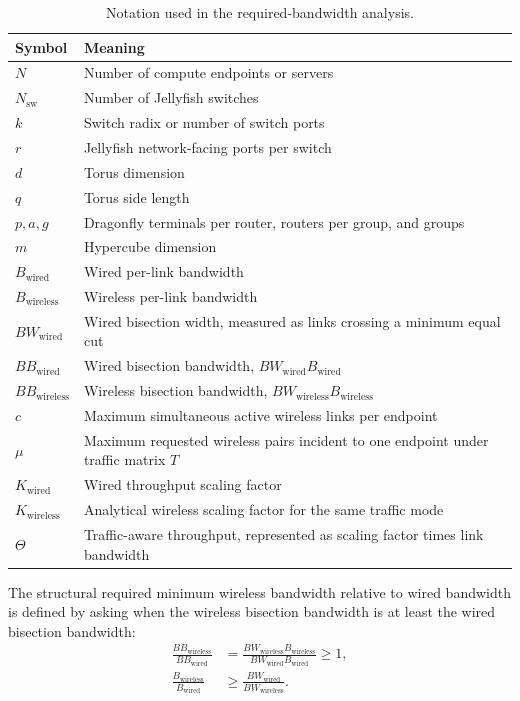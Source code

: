 \documentclass[conference]{IEEEtran}
\begin{document}
\begin{table}[!t]
\centering
\caption{Notation used in the required-bandwidth analysis.}
\scriptsize
\begin{tabular}{p{}p{}}
\toprule
Symbol & Meaning \\
\midrule
\(N\) & Number of compute endpoints or servers \\
\(N_{\mathrm{sw}}\) & Number of Jellyfish switches \\
\(k\) & Switch radix or number of switch ports \\
\(r\) & Jellyfish network-facing ports per switch \\
\(d\) & Torus dimension \\
\(q\) & Torus side length \\
\(p,a,g\) & Dragonfly terminals per router, routers per group, and groups \\
\(m\) & Hypercube dimension \\
\(B_{\mathrm{wired}}\) & Wired per-link bandwidth \\
\(B_{\mathrm{wireless}}\) & Wireless per-link bandwidth \\
\(BW_{\mathrm{wired}}\) & Wired bisection width, measured as links crossing a minimum equal cut \\
\(BB_{\mathrm{wired}}\) & Wired bisection bandwidth, \(BW_{\mathrm{wired}}B_{\mathrm{wired}}\) \\
\(BB_{\mathrm{wireless}}\) & Wireless bisection bandwidth, \(BW_{\mathrm{wireless}}B_{\mathrm{wireless}}\) \\
\(c\) & Maximum simultaneous active wireless links per endpoint \\
\(\mu\) & Maximum requested wireless pairs incident to one endpoint under traffic matrix \(T\) \\
\(K_{\mathrm{wired}}\) & Wired throughput scaling factor \\
\(K_{\mathrm{wireless}}\) & Analytical wireless scaling factor for the same traffic mode \\
\(\Theta\) & Traffic-aware throughput, represented as scaling factor times link bandwidth \\
\bottomrule
\end{tabular}
\end{table}

The structural required minimum wireless bandwidth relative to wired bandwidth is defined by asking when the wireless bisection bandwidth is at least the wired bisection bandwidth:
\begin{align}
\frac{BB_{\mathrm{wireless}}}{BB_{\mathrm{wired}}}
&=
\frac{BW_{\mathrm{wireless}}B_{\mathrm{wireless}}}{BW_{\mathrm{wired}}B_{\mathrm{wired}}}
\ge 1, \\
\frac{B_{\mathrm{wireless}}}{B_{\mathrm{wired}}}
&\ge
\frac{BW_{\mathrm{wired}}}{BW_{\mathrm{wireless}}}.
\end{align}
\end{document}
